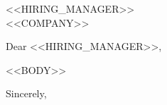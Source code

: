 \documentclass{letter}
\begin{document}
\begin{letter}{<<HIRING_MANAGER>> \\ <<COMPANY>>}
\opening{Dear <<HIRING_MANAGER>>,}

<<BODY>>

\closing{Sincerely,}
\end{letter}
\end{document}

